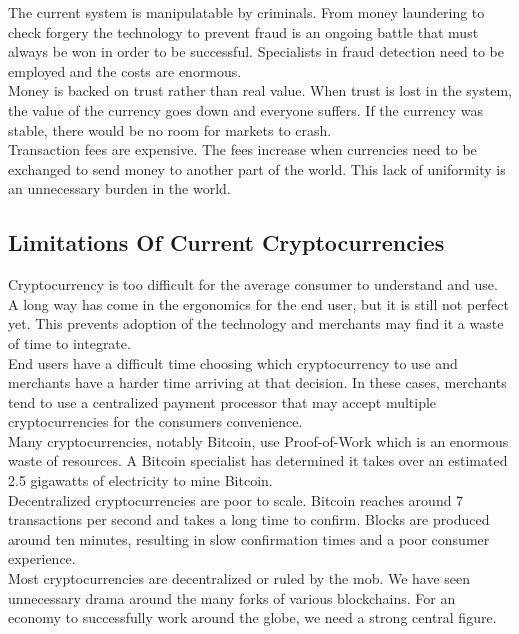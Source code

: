 \documentclass[12pt,a4paper]{article}
\begin{document}
  The current system is manipulatable by criminals. From money laundering to
  check forgery the technology to prevent fraud is an ongoing battle that must
  always be won in order to be successful. Specialists in fraud detection need
  to be employed and the costs are enormous.\\

  Money is backed on trust rather than real value. When trust is lost in the
  system, the value of the currency goes down and everyone suffers. If the
  currency was stable, there would be no room for markets to crash.\\

  Transaction fees are expensive. The fees increase when currencies need to be
  exchanged to send money to another part of the world. This lack of uniformity
  is an unnecessary burden in the world.

  \subsection{Limitations Of Current Cryptocurrencies}
  Cryptocurrency is too difficult for the average consumer to understand and
  use. A long way has come in the ergonomics for the end user, but it is still
  not perfect yet. This prevents adoption of the technology and merchants may
  find it a waste of time to integrate.\\

  End users have a difficult time choosing which cryptocurrency to use and
  merchants have a harder time arriving at that decision. In these cases,
  merchants tend to use a centralized payment processor that may accept multiple
  cryptocurrencies for the consumers convenience.\\

  Many cryptocurrencies, notably Bitcoin, use Proof-of-Work which is an enormous
  waste of resources. A Bitcoin specialist has determined it takes over an
  estimated 2.5 gigawatts of electricity to mine Bitcoin.\\

  Decentralized cryptocurrencies are poor to scale. Bitcoin reaches around 7
  transactions per second and takes a long time to confirm. Blocks are produced
  around ten minutes, resulting in slow confirmation times and a poor consumer
  experience.\\

  Most cryptocurrencies are decentralized or ruled by the mob. We have seen
  unnecessary drama around the many forks of various blockchains. For an economy
  to successfully work around the globe, we need a strong central figure.
\end{document}
